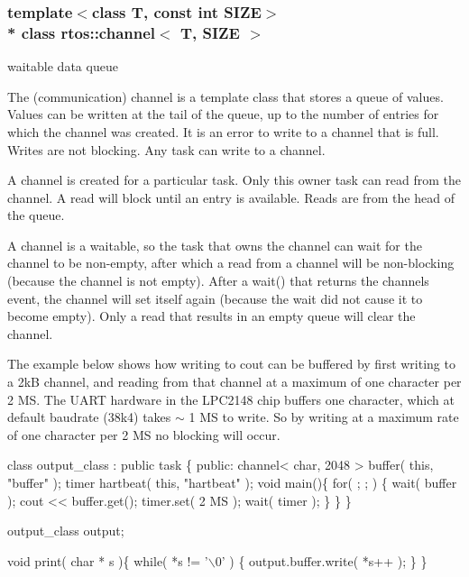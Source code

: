 \subsubsection*{template$<$class T, const int S\+I\+ZE$>$\\*
class rtos\+::channel$<$ T, S\+I\+Z\+E $>$}

waitable data queue 

The (communication) channel is a template class that stores a queue of values. Values can be written at the tail of the queue, up to the number of entries for which the channel was created. It is an error to write to a channel that is full. Writes are not blocking. Any task can write to a channel.

A channel is created for a particular task. Only this owner task can read from the channel. A read will block until an entry is available. Reads are from the head of the queue.

A channel is a waitable, so the task that owns the channel can wait for the channel to be non-\/empty, after which a read from a channel will be non-\/blocking (because the channel is not empty). After a wait() that returns the channel\textquotesingle{}s event, the channel will set itself again (because the wait did not cause it to become empty). Only a read that results in an empty queue will clear the channel.

The example below shows how writing to cout can be buffered by first writing to a 2kB channel, and reading from that channel at a maximum of one character per 2 MS. The U\+A\+RT hardware in the L\+P\+C2148 chip buffers one character, which at default baudrate (38k4) takes $\sim$ 1 MS to write. So by writing at a maximum rate of one character per 2 MS no blocking will occur.


\begin{DoxyCode}
\textcolor{keyword}{class }output\_class : \textcolor{keyword}{public} task \{
\textcolor{keyword}{public}:
   channel< char, 2048 > buffer( \textcolor{keyword}{this}, \textcolor{stringliteral}{"buffer"} );
   timer hartbeat( \textcolor{keyword}{this}, \textcolor{stringliteral}{"hartbeat"} );
   \textcolor{keywordtype}{void} main()\{
      \textcolor{keywordflow}{for}( ; ; ) \{
         wait( buffer );
         cout << buffer.get();
         timer.set( 2 MS );
         wait( timer );
     \}
   \}
\}

output\_class output;

\textcolor{keywordtype}{void} print( \textcolor{keywordtype}{char} * s )\{
   \textcolor{keywordflow}{while}( *s != \textcolor{charliteral}{'\(\backslash\)0'} ) \{ output.buffer.write( *s++ ); \}
\}
\end{DoxyCode}
 


